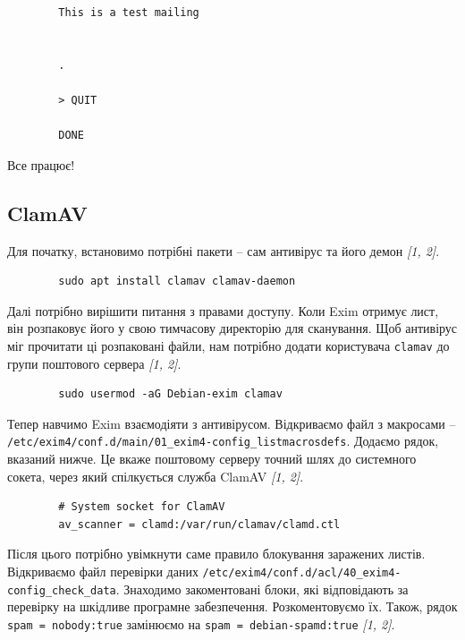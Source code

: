 \documentclass[14pt, a4paper]{extreport}
\begin{document}
\begin{verbatim}
		This is a test mailing
		
		
		.
		
		> QUIT
		
		DONE
	\end{verbatim}
	
	Все працює!
	
	\subsection*{ClamAV} 
	
	Для початку, встановимо потрібні пакети -- сам антивірус та його демон \textit{[1, 2]}.
	
	\begin{verbatim}
		sudo apt install clamav clamav-daemon
	\end{verbatim}
	
	Далі потрібно вирішити питання з правами доступу. Коли Exim отримує лист, він розпаковує його у свою тимчасову директорію для сканування. Щоб антивірус міг прочитати ці розпаковані файли, нам потрібно додати користувача \texttt{clamav} до групи поштового сервера \textit{[1, 2]}.
	
	\begin{verbatim}
		sudo usermod -aG Debian-exim clamav
	\end{verbatim}
	
	Тепер навчимо Exim взаємодіяти з антивірусом. Відкриваємо файл з макросами -- \texttt{/etc/exim4/conf.d/main/01\_exim4-config\_listmacrosdefs}. Додаємо рядок, вказаний нижче. Це вкаже поштовому серверу точний шлях до системного сокета, через який спілкується служба ClamAV \textit{[1, 2]}.
	
	\begin{verbatim}
		# System socket for ClamAV
		av_scanner = clamd:/var/run/clamav/clamd.ctl
	\end{verbatim}
	
	Після цього потрібно увімкнути саме правило блокування заражених листів. Відкриваємо файл перевірки даних \texttt{/etc/exim4/conf.d/acl/40\_exim4-config\_check\_data}. Знаходимо закоментовані блоки, які відповідають за перевірку на шкідливе програмне забезпечення. Розкоментовуємо їх. Також, рядок \texttt{spam = nobody:true} замінюємо на \texttt{spam = debian-spamd:true} \textit{[1, 2]}.
	
\end{document}
